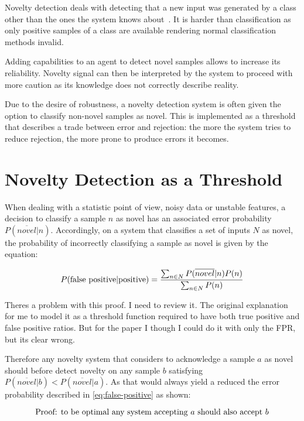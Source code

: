Novelty detection deals with detecting that a new input was generated by a class
other than the ones the system knows about~\cite{markou2003novelty}.
It is harder than classification as only positive samples of a class are available
rendering normal classification methods invalid.

Adding capabilities to an agent to detect novel samples allows to increase its
reliability. Novelty signal can then be interpreted by the system to proceed
with more caution as its knowledge does not correctly describe reality.

Due to the desire of robustness, a novelty detection system is often given the option
to classify non-novel samples as novel. This is implemented as a threshold that describes a trade
between error and rejection: the more the system tries to reduce rejection, the more
prone to produce errors it becomes.



\section{Novelty Detection as a Threshold}
When dealing with a statistic point of view, noisy data or unstable features,
a decision to classify a sample $n$ as novel has an associated error probability
$P(\overline{novel}|n)$.
Accordingly, on a system that classifies a set of inputs $N$ as novel, the
probability of incorrectly classifying a sample as novel is given by the
equation:

\begin{equation}
\label{eq:false-positive}
P(\textnormal{false positive}|\textnormal{positive}) = \frac{\sum_{n \in N}{P(\overline{novel}|n)P(n)}}{\sum_{n \in N}{P(n)}}
\end{equation}

Theres a problem with this proof. I need to review it. The original explanation
for me to model it as a threshold function required to have both true positive
and false positive ratios. But for the paper I though I could do it with only
the FPR, but its clear wrong.

Therefore any novelty system that considers to acknowledge a sample
$a$ as novel should before detect novelty on any sample $b$ satisfying
$P(\overline{novel}|b) < P(\overline{novel}|a)$.
As that would always yield a reduced the error probability described in
\autoref{eq:false-positive} as shown:

\begin{equation}
\textnormal{Proof: to be optimal any system accepting }a\textnormal{ should also accept }b
\end{equation}

